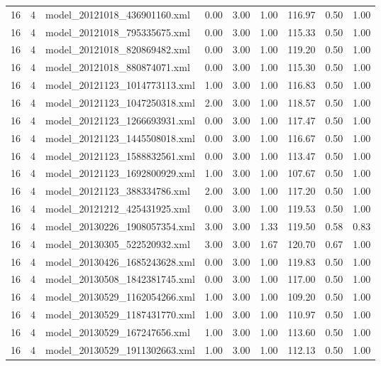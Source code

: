 \begin{table}[ht]
\begin{tabular}{rrlrrrrrr}
   16 &   4 & model\_20121018\_436901160.xml & 0.00 & 3.00 & 1.00 & 116.97 & 0.50 & 1.00 \\ 
   16 &   4 & model\_20121018\_795335675.xml & 0.00 & 3.00 & 1.00 & 115.33 & 0.50 & 1.00 \\ 
   16 &   4 & model\_20121018\_820869482.xml & 0.00 & 3.00 & 1.00 & 119.20 & 0.50 & 1.00 \\ 
   16 &   4 & model\_20121018\_880874071.xml & 0.00 & 3.00 & 1.00 & 115.30 & 0.50 & 1.00 \\ 
   16 &   4 & model\_20121123\_1014773113.xml & 1.00 & 3.00 & 1.00 & 116.83 & 0.50 & 1.00 \\ 
   16 &   4 & model\_20121123\_1047250318.xml & 2.00 & 3.00 & 1.00 & 118.57 & 0.50 & 1.00 \\ 
   16 &   4 & model\_20121123\_1266693931.xml & 0.00 & 3.00 & 1.00 & 117.47 & 0.50 & 1.00 \\ 
   16 &   4 & model\_20121123\_1445508018.xml & 0.00 & 3.00 & 1.00 & 116.67 & 0.50 & 1.00 \\ 
   16 &   4 & model\_20121123\_1588832561.xml & 0.00 & 3.00 & 1.00 & 113.47 & 0.50 & 1.00 \\ 
   16 &   4 & model\_20121123\_1692800929.xml & 1.00 & 3.00 & 1.00 & 107.67 & 0.50 & 1.00 \\ 
   16 &   4 & model\_20121123\_388334786.xml & 2.00 & 3.00 & 1.00 & 117.20 & 0.50 & 1.00 \\ 
   16 &   4 & model\_20121212\_425431925.xml & 0.00 & 3.00 & 1.00 & 119.53 & 0.50 & 1.00 \\ 
   16 &   4 & model\_20130226\_1908057354.xml & 3.00 & 3.00 & 1.33 & 119.50 & 0.58 & 0.83 \\ 
   16 &   4 & model\_20130305\_522520932.xml & 3.00 & 3.00 & 1.67 & 120.70 & 0.67 & 1.00 \\ 
   16 &   4 & model\_20130426\_1685243628.xml & 0.00 & 3.00 & 1.00 & 119.83 & 0.50 & 1.00 \\ 
   16 &   4 & model\_20130508\_1842381745.xml & 0.00 & 3.00 & 1.00 & 117.00 & 0.50 & 1.00 \\ 
   16 &   4 & model\_20130529\_1162054266.xml & 1.00 & 3.00 & 1.00 & 109.20 & 0.50 & 1.00 \\ 
   16 &   4 & model\_20130529\_1187431770.xml & 1.00 & 3.00 & 1.00 & 110.97 & 0.50 & 1.00 \\ 
   16 &   4 & model\_20130529\_167247656.xml & 1.00 & 3.00 & 1.00 & 113.60 & 0.50 & 1.00 \\ 
   16 &   4 & model\_20130529\_1911302663.xml & 1.00 & 3.00 & 1.00 & 112.13 & 0.50 & 1.00 \\ 

\end{tabular}
\end{table}
